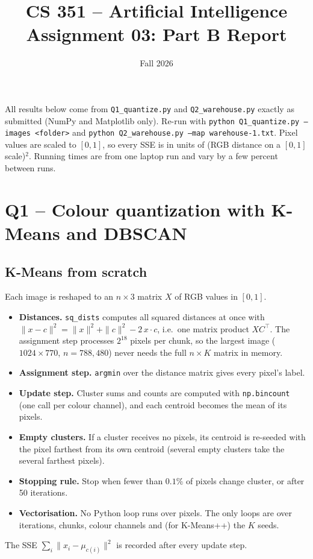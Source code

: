 \documentclass[10.5pt]{article}
\title{\vspace{-1.2cm}CS 351 -- Artificial Intelligence\\ Assignment 03: Part B Report}
\author{\members}
\date{Fall 2026}
\begin{document}
\maketitle
\vspace{-0.6cm}

\noindent All results below come from \texttt{Q1\_quantize.py} and \texttt{Q2\_warehouse.py} exactly as submitted
(NumPy and Matplotlib only). Re-run with
\texttt{python Q1\_quantize.py --images <folder>} and \texttt{python Q2\_warehouse.py --map warehouse-1.txt}.
Pixel values are scaled to $[0,1]$, so every SSE is in units of (RGB distance on a $[0,1]$ scale)$^2$.
Running times are from one laptop run and vary by a few percent between runs.

\tableofcontents

\section{Q1 -- Colour quantization with K-Means and DBSCAN}

\subsection{K-Means from scratch}

Each image is reshaped to an $n\times 3$ matrix $X$ of RGB values in $[0,1]$.
\begin{itemize}
  \item \textbf{Distances.} \texttt{sq\_dists} computes all squared distances at once with
        $\|x-c\|^2=\|x\|^2+\|c\|^2-2\,x\!\cdot\!c$, i.e.\ one matrix product $X C^\top$.
        The assignment step processes $2^{18}$ pixels per chunk, so the largest image
        ($1024\times770$, $n=788{,}480$) never needs the full $n\times K$ matrix in memory.
  \item \textbf{Assignment step.} \texttt{argmin} over the distance matrix gives every pixel's label.
  \item \textbf{Update step.} Cluster sums and counts are computed with \texttt{np.bincount}
        (one call per colour channel), and each centroid becomes the mean of its pixels.
  \item \textbf{Empty clusters.} If a cluster receives no pixels, its centroid is re-seeded with the
        pixel farthest from its own centroid (several empty clusters take the several farthest pixels).
  \item \textbf{Stopping rule.} Stop when fewer than $0.1\%$ of pixels change cluster, or after 50 iterations.
  \item \textbf{Vectorisation.} No Python loop runs over pixels. The only loops are over iterations,
        chunks, colour channels and (for K-Means++) the $K$ seeds.
\end{itemize}
The SSE $\sum_i\|x_i-\mu_{c(i)}\|^2$ is recorded after every update step.
\end{document}
